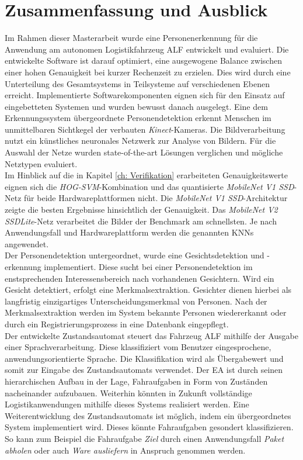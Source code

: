 \chapter{Zusammenfassung und Ausblick}
\label{Fazit und Ausblick}
	
Im Rahmen dieser Masterarbeit wurde eine Personenerkennung für die Anwendung am autonomen Logistikfahrzeug ALF entwickelt und evaluiert. Die entwickelte Software ist darauf optimiert, eine ausgewogene Balance zwischen einer hohen Genauigkeit bei kurzer Rechenzeit zu erzielen. Dies wird durch eine Unterteilung des Gesamtsystems in Teilsysteme auf verschiedenen Ebenen erreicht. Implementierte Softwarekomponenten eignen sich für den Einsatz auf eingebetteten Systemen und wurden bewusst danach ausgelegt. Eine dem Erkennungssystem übergeordnete Personendetektion erkennt Menschen im unmittelbaren Sichtkegel der verbauten \textit{Kinect}-Kameras. Die Bildverarbeitung nutzt ein künstliches neuronales Netzwerk zur Analyse von Bildern. Für die Auswahl der Netze wurden state-of-the-art Lösungen verglichen und mögliche Netztypen evaluiert.\\

Im Hinblick auf die in Kapitel \ref{ch: Verifikation} erarbeiteten Genauigkeitswerte eignen sich die \textit{HOG-SVM}-Kombination und das quantisierte \textit{MobileNet V1 SSD}-Netz für beide Hardwareplattformen nicht. Die \textit{MobileNet V1 SSD}-Architektur zeigte die besten Ergebnisse hinsichtlich der Genauigkeit. Das \textit{MobileNet V2 SSDLite}-Netz verarbeitet die Bilder der Benchmark am schnellsten. Je nach Anwendungsfall und Hardwareplattform werden die genannten KNNs angewendet.     \\

Der Personendetektion untergeordnet, wurde eine Gesichtsdetektion und -erkennung implementiert. Diese sucht bei einer Personendetektion im enstsprechenden Interessensbereich nach vorhandenen Gesichtern. Wird ein Gesicht detektiert, erfolgt eine Merkmalsextraktion. Gesichter dienen hierbei als langfristig einzigartiges Unterscheidungsmerkmal von Personen. Nach der Merkmalsextraktion werden im System bekannte Personen wiedererkannt oder durch ein Registrierungsprozess in eine Datenbank eingepflegt.\\

Der entwickelte Zustandsautomat steuert das Fahrzeug ALF mithilfe der Ausgabe einer Sprachverarbeitung. Diese klassifiziert vom Benutzer eingesprochene, anwendungsorientierte Sprache. Die Klassifikation wird als Übergabewert und somit zur Eingabe des Zustandsautomats verwendet. Der EA ist durch seinen hierarchischen Aufbau in der Lage, Fahraufgaben in Form von Zuständen nacheinander aufzubauen. Weiterhin könnten in Zukunft vollständige Logistikanwendungen mithilfe dieses Systems realisiert werden. Eine Weiterentwicklung des Zustandsautomats ist möglich, indem ein übergeordnetes System implementiert wird. Dieses könnte Fahraufgaben gesondert klassifizieren. So kann zum Beispiel die Fahraufgabe \textit{Ziel} durch einen Anwendungsfall \textit{Paket abholen} oder auch \textit{Ware ausliefern} in Anspruch genommen werden.\\

